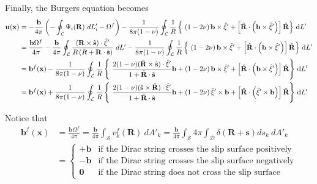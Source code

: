 Finally, the Burgers equation becomes
\begin{align}
 \mathbf{u}(\mathbf x)
 &=-\frac{\mathbf{ b}}{4\pi}\left(-\oint_\mathcal{L}\Psi_i(\mathbf{R})\ dL'_i-\Omega^f\right)-\frac{1}{8\pi(1-\nu)}\oint_\mathcal{L}\frac{1}{R}\left\{\ 
 \left(1-2\nu\right) \mathbf{ b}\times\hat{\mathbf{ \xi}}'
+ \left[\hat{\mathbf{ R}}\cdot\left(\mathbf{ b}\times\hat{\mathbf{ \xi}}' \right) \right]\hat{\mathbf{ R}}  \right\}\dL'\nonumber\\
&=\frac{\mathbf{ b}\Omega^f}{4\pi}
-\frac{\mathbf{ b}}{4\pi}\oint_\mathcal{L}\frac{(\mathbf{R}\times\hat{\mathbf{s}})\cdot\hat{\mathbf{\xi}}'}{R\left(R+\mathbf{R}\cdot\hat{\mathbf{s}}\right)}\ dL'
-\frac{1}{8\pi(1-\nu)}\oint_\mathcal{L}\frac{1}{R}\left\{\ 
 \left(1-2\nu\right) \mathbf{ b}\times\hat{\mathbf{ \xi}}'
+ \left[\hat{\mathbf{ R}}\cdot\left(\mathbf{ b}\times\hat{\mathbf{ \xi}}' \right) \right]\hat{\mathbf{ R}}  \right\}\dL'\nonumber\\
&=\mathbf{b}^f(\mathbf x)
-\frac{1}{8\pi(1-\nu)}\oint_\mathcal{L}   
\frac{1}{R}\left\{\ \frac{2(1-\nu)(\hat{\mathbf{R}}\times\hat{\mathbf{s}})\cdot\hat{\mathbf{\xi}}'}{1+\hat{\mathbf{R}}\cdot\hat{\mathbf{s}}}\mathbf{ b}
+ \left(1-2\nu\right) \mathbf{ b}\times\hat{\mathbf{ \xi}}'
+ \left[\hat{\mathbf{ R}}\cdot\left(\mathbf{ b}\times\hat{\mathbf{ \xi}}' \right) \right]\hat{\mathbf{ R}}  \right\}\dL'\nonumber\\
&=\mathbf{b}^f(\mathbf x)
+\frac{1}{8\pi(1-\nu)}\oint_\mathcal{L}   
\frac{1}{R}\left\{\ \frac{2(1-\nu)(\hat{\mathbf{s}}\times\hat{\mathbf{R}})\cdot\hat{\mathbf{\xi}}'}{1+\hat{\mathbf{R}}\cdot\hat{\mathbf{s}}}\mathbf{ b}
+ \left(1-2\nu\right) \hat{\mathbf{ \xi}}'\times \mathbf{ b}
+ \left[\hat{\mathbf{ R}}\cdot\left(\hat{\mathbf{ \xi}}'\times\mathbf{ b} \right) \right]\hat{\mathbf{ R}}  \right\}\dL'\nonumber\\
\end{align}

Notice that
\begin{align}
\mathbf{b}^f(\mathbf x)
&=\frac{\mathbf{ b}\Omega^f}{4\pi}
=\frac{\mathbf{ b}}{4\pi}\int_\mathcal{S} v^f_k(\mathbf{R})\ dA'_k
=\frac{\mathbf{ b}}{4\pi}\int_\mathcal{S} 4\pi\int_\mathcal{D}\delta(\mathbf{R}+\mathbf{s})ds_k\ dA'_k\nonumber\\
&=\begin{cases}
+\mathbf{b}&\mbox{if the Dirac string crosses the slip surface positively}\\
-\mathbf{b}&\mbox{if the Dirac string crosses the slip surface negatively}\\
\mathbf{0}&\mbox{if the Dirac string does not cross the slip surface }
\end{cases}
\end{align}

